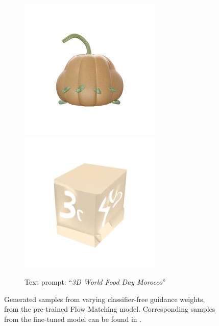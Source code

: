 \begin{figure}[h!]
\begin{subfigure}[t]{0.49\linewidth}
        \includegraphics[width=0.24\linewidth]{figs/samples/cfg4.0_prompt_74_image_8.jpg}\,%
        \includegraphics[width=0.24\linewidth]{figs/samples/cfg4.0_prompt_74_image_9.jpg}
        \caption*{Text prompt: ``\textit{3D World Food Day Morocco}''}
    \end{subfigure}
    \caption{
    Generated samples from varying classifier-free guidance weights, from the pre-trained Flow Matching model. 
    Corresponding samples from the fine-tuned model can be found in . 
    }
    \label{fig:ablation_tradeoff_cfg_base}
\end{figure}


